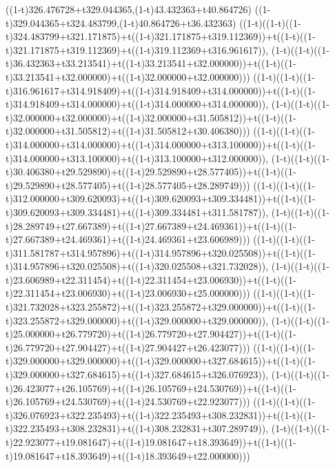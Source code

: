 ((1-t)326.476728+t329.044365,(1-t)43.432363+t40.864726)
((1-t)329.044365+t324.483799,(1-t)40.864726+t36.432363)
((1-t)((1-t)((1-t)324.483799+t321.171875)+t((1-t)321.171875+t319.112369))+t((1-t)((1-t)321.171875+t319.112369)+t((1-t)319.112369+t316.961617)),                                     (1-t)((1-t)((1-t)36.432363+t33.213541)+t((1-t)33.213541+t32.000000))+t((1-t)((1-t)33.213541+t32.000000)+t((1-t)32.000000+t32.000000)))
((1-t)((1-t)((1-t)316.961617+t314.918409)+t((1-t)314.918409+t314.000000))+t((1-t)((1-t)314.918409+t314.000000)+t((1-t)314.000000+t314.000000)),                                     (1-t)((1-t)((1-t)32.000000+t32.000000)+t((1-t)32.000000+t31.505812))+t((1-t)((1-t)32.000000+t31.505812)+t((1-t)31.505812+t30.406380)))
((1-t)((1-t)((1-t)314.000000+t314.000000)+t((1-t)314.000000+t313.100000))+t((1-t)((1-t)314.000000+t313.100000)+t((1-t)313.100000+t312.000000)),                                     (1-t)((1-t)((1-t)30.406380+t29.529890)+t((1-t)29.529890+t28.577405))+t((1-t)((1-t)29.529890+t28.577405)+t((1-t)28.577405+t28.289749)))
((1-t)((1-t)((1-t)312.000000+t309.620093)+t((1-t)309.620093+t309.334481))+t((1-t)((1-t)309.620093+t309.334481)+t((1-t)309.334481+t311.581787)),                                     (1-t)((1-t)((1-t)28.289749+t27.667389)+t((1-t)27.667389+t24.469361))+t((1-t)((1-t)27.667389+t24.469361)+t((1-t)24.469361+t23.606989)))
((1-t)((1-t)((1-t)311.581787+t314.957896)+t((1-t)314.957896+t320.025508))+t((1-t)((1-t)314.957896+t320.025508)+t((1-t)320.025508+t321.732028)),                                     (1-t)((1-t)((1-t)23.606989+t22.311454)+t((1-t)22.311454+t23.006930))+t((1-t)((1-t)22.311454+t23.006930)+t((1-t)23.006930+t25.000000)))
((1-t)((1-t)((1-t)321.732028+t323.255872)+t((1-t)323.255872+t329.000000))+t((1-t)((1-t)323.255872+t329.000000)+t((1-t)329.000000+t329.000000)),                                     (1-t)((1-t)((1-t)25.000000+t26.779720)+t((1-t)26.779720+t27.904427))+t((1-t)((1-t)26.779720+t27.904427)+t((1-t)27.904427+t26.423077)))
((1-t)((1-t)((1-t)329.000000+t329.000000)+t((1-t)329.000000+t327.684615))+t((1-t)((1-t)329.000000+t327.684615)+t((1-t)327.684615+t326.076923)),                                     (1-t)((1-t)((1-t)26.423077+t26.105769)+t((1-t)26.105769+t24.530769))+t((1-t)((1-t)26.105769+t24.530769)+t((1-t)24.530769+t22.923077)))
((1-t)((1-t)((1-t)326.076923+t322.235493)+t((1-t)322.235493+t308.232831))+t((1-t)((1-t)322.235493+t308.232831)+t((1-t)308.232831+t307.289749)),                                     (1-t)((1-t)((1-t)22.923077+t19.081647)+t((1-t)19.081647+t18.393649))+t((1-t)((1-t)19.081647+t18.393649)+t((1-t)18.393649+t22.000000)))

